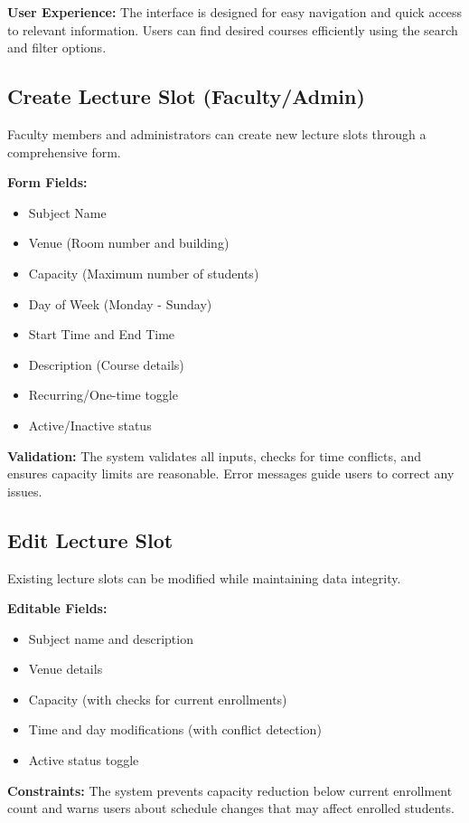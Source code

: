 \textbf{User Experience:} The interface is designed for easy navigation and quick access to relevant information. Users can find desired courses efficiently using the search and filter options.

\subsection{Create Lecture Slot (Faculty/Admin)}
Faculty members and administrators can create new lecture slots through a comprehensive form.

\textbf{Form Fields:}
\begin{itemize}
    \item Subject Name
    \item Venue (Room number and building)
    \item Capacity (Maximum number of students)
    \item Day of Week (Monday - Sunday)
    \item Start Time and End Time
    \item Description (Course details)
    \item Recurring/One-time toggle
    \item Active/Inactive status
\end{itemize}

\textbf{Validation:} The system validates all inputs, checks for time conflicts, and ensures capacity limits are reasonable. Error messages guide users to correct any issues.

\subsection{Edit Lecture Slot}
Existing lecture slots can be modified while maintaining data integrity.

\textbf{Editable Fields:}
\begin{itemize}
    \item Subject name and description
    \item Venue details
    \item Capacity (with checks for current enrollments)
    \item Time and day modifications (with conflict detection)
    \item Active status toggle
\end{itemize}

\textbf{Constraints:} The system prevents capacity reduction below current enrollment count and warns users about schedule changes that may affect enrolled students.

